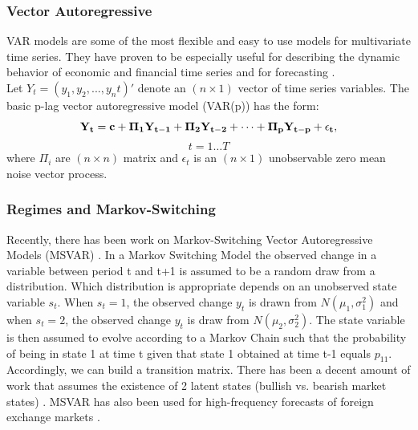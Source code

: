 \subsubsection{Vector Autoregressive}
VAR models are some of the most flexible and easy to use models for multivariate time series. They have proven to be especially useful for describing the dynamic behavior of economic and financial time series and for forecasting \cite{tsay, VAR}. \\
Let $Y_t = (y_1, y_2,...,y_nt)'$ denote an $(n \times 1)$ vector of time series variables. The basic p-lag vector autoregressive model (VAR(p)) has the form:
$$\bf{Y}_t=\bf{c}+\bf{\Pi}_1\bf{Y}_{t-1}+\bf{\Pi}_2\bf{Y}_{t-2}+\cdots+\bf{\Pi}_p\bf{Y}_{t-p}+\epsilon_t,$$ $$t=1\ldots T$$
where $\Pi_i$ are $(n \times n)$ matrix and $\epsilon_t$ is an $(n \times 1)$ unobservable zero mean noise vector process.
\subsubsection{Regimes and Markov-Switching}
Recently, there has been work on Markov-Switching Vector Autoregressive Models (MSVAR) \cite{tsay}. In a Markov Switching Model the observed change in a variable between period t and t+1 is assumed to be a random draw from a distribution. Which distribution is appropriate depends  on an unobserved state variable $s_t$. When $s_t=1$, the observed change $y_t$ is drawn from $N(\mu_1,\sigma_1^2)$ and when $s_t=2$, the observed change $y_t$ is draw from $N(\mu_2,\sigma_2^2)$.
The state variable is then assumed to evolve according to a Markov Chain such that the probability of being in state 1 at time t given that state 1 obtained at time t-1 equals $p_{11}$. Accordingly, we can build a transition matrix. There has been a decent amount of work that assumes the existence of 2 latent states (bullish vs. bearish market states) \cite{OIL}. MSVAR has also been used for high-frequency forecasts of foreign exchange markets \cite{MSVAR}.
